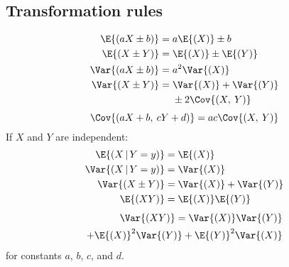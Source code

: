 \documentclass{article}
\begin{document}
\begin{multicols}{3}
    \subsection{Transformation rules}
    \begin{align*}
        \E{\left( aX \pm b \right)}   & = a\E{\left( X \right)} \pm b                        \\
        \E{\left( X \pm Y \right)}    & = \E{\left( X \right)} \pm \E{\left( Y \right)}      \\
        \Var{\left( aX \pm b \right)} & = a^2\Var{\left( X \right)}                          \\
        \Var{\left( X \pm Y \right)}  & = \begin{aligned}[t]
                                               & \Var{\left( X \right)} + \Var{\left( Y \right)} \\
                                               & \pm 2\Cov{\left( X,\: Y \right)}
                                          \end{aligned}
    \end{align*}
    \begin{equation*}
        \Cov{\left( aX + b,\: cY + d \right)} = ac \Cov{\left( X,\: Y \right)}
    \end{equation*}
    If \(X\) and \(Y\) are independent:
    \begingroup
    \allowdisplaybreaks
    \begin{align*}
        \E{\left( X \,\vert\, Y = y \right)}   & = \E{\left( X \right)}                            \\
        \Var{\left( X \,\vert\, Y = y \right)} & = \Var{\left( X \right)}                          \\
        \Var{\left( X \pm Y \right)}           & = \Var{\left( X \right)} + \Var{\left( Y \right)} \\
        \E{\left( XY \right)}                  & = \E{\left( X \right)} \E{\left( Y \right)}
    \end{align*}
    \endgroup
    \begin{align*}
        \Var{\left( XY \right)}      = \Var{\left( X \right)} \Var{\left( Y \right)} \\
        + \E{\left( X \right)}^2 \Var{\left( Y \right)} + \E{\left( Y \right)}^2 \Var{\left( X \right)}
    \end{align*}
    for constants \(a\), \(b\), \(c\), and \(d\).

\end{multicols}
\end{document}
